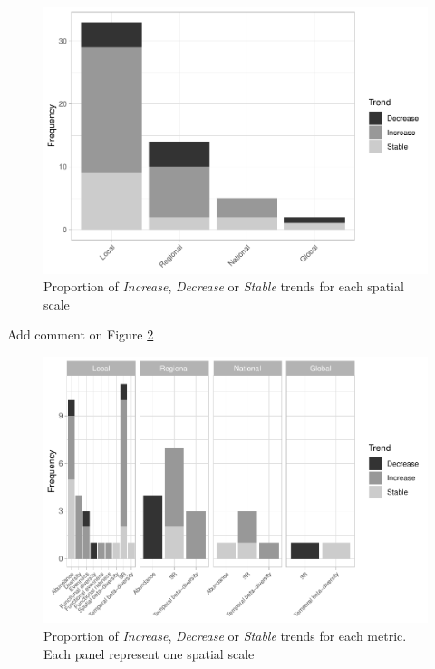 \documentclass[
  12pt,
  oneside]{report}
\begin{document}
\begin{figure}
\centering
\includegraphics{literature_review_files/figure-latex/barspatscale-1.pdf}
\caption{\label{fig:barspatscale}Proportion of \emph{Increase}, \emph{Decrease} or \emph{Stable} trends for each spatial scale}
\end{figure}

Add comment on Figure \ref{fig:barmetricsperspatscale}

\begin{figure}
\centering
\includegraphics{literature_review_files/figure-latex/barmetricsperspatscale-1.pdf}
\caption{\label{fig:barmetricsperspatscale}Proportion of \emph{Increase}, \emph{Decrease} or \emph{Stable} trends for each metric. Each panel represent one spatial scale}
\end{figure}
\end{document}
